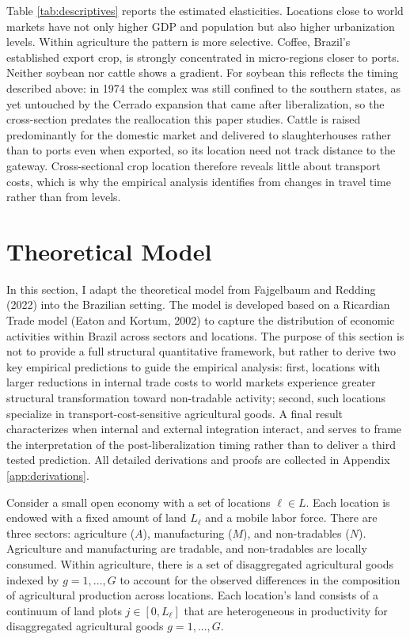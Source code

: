 \documentclass[11pt]{article}
\begin{document}
Table \ref{tab:descriptives} reports the estimated elasticities. Locations close to world markets have not only higher GDP and population but also higher urbanization levels. Within agriculture the pattern is more selective. Coffee, Brazil's established export crop, is strongly concentrated in micro-regions closer to ports. Neither soybean nor cattle shows a gradient. For soybean this reflects the timing described above: in 1974 the complex was still confined to the southern states, as yet untouched by the Cerrado expansion that came after liberalization, so the cross-section predates the reallocation this paper studies. Cattle is raised predominantly for the domestic market and delivered to slaughterhouses rather than to ports even when exported, so its location need not track distance to the gateway. Cross-sectional crop location therefore reveals little about transport costs, which is why the empirical analysis identifies from changes in travel time rather than from levels.

\section{Theoretical Model}

In this section, I adapt the theoretical model from Fajgelbaum and Redding (2022) into the Brazilian setting. The model is developed based on a Ricardian Trade model (Eaton and Kortum, 2002) to capture the distribution of economic activities within Brazil across sectors and locations.
The purpose of this section is not to provide a full structural quantitative framework, but rather to derive two key empirical predictions to guide the empirical analysis: first, locations with larger reductions in internal trade costs to world markets experience greater structural transformation toward non-tradable activity; second, such locations specialize in transport-cost-sensitive agricultural goods. A final result characterizes when internal and external integration interact, and serves to frame the interpretation of the post-liberalization timing rather than to deliver a third tested prediction. All detailed derivations and proofs are collected in Appendix \ref{app:derivations}.

Consider a small open economy with a set of locations $\ell \in L$. Each location is endowed with a fixed amount of land $L_\ell$ and a mobile labor force. There are three sectors: agriculture ($A$), manufacturing ($M$), and non-tradables ($N$). Agriculture and manufacturing are tradable, and non-tradables are locally consumed. Within agriculture, there is a set of disaggregated agricultural goods indexed by $g = 1,\dots,G$ to account for the observed differences in the composition of agricultural production across locations. Each location's land consists of a continuum of land plots $j\in[0,L_{\ell}]$ that are heterogeneous in productivity for disaggregated agricultural goods $g=1,..., G$. 
\end{document}
